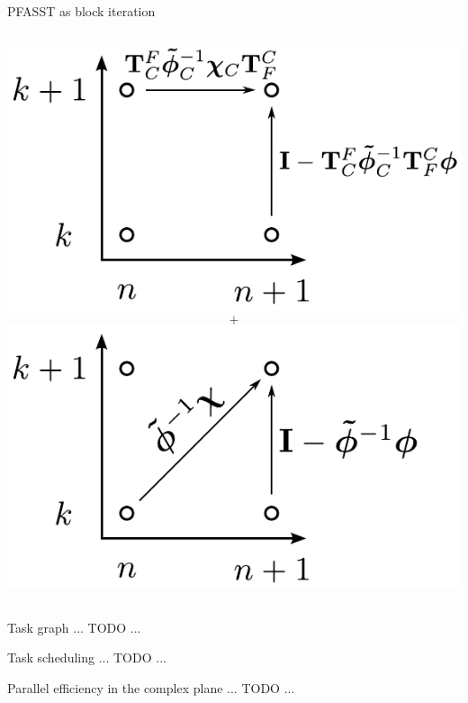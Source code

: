 \documentclass[11pt,aspectratio=43]{beamer}
\begin{document}
\begin{frame}{PFASST as block iteration}
\begin{columns}
		\centering
		\includegraphics[width=\linewidth]{kn-approxCGC.pdf}
		$$\textbf{+}$$
		\includegraphics[width=\linewidth]{kn-approxBlockJacobi.pdf}\vspace{-20pt}
	\end{columns}
\end{frame}

\begin{frame}{Task graph}
	... TODO ...
\end{frame}

\begin{frame}{Task scheduling}
	... TODO ...
\end{frame}

\begin{frame}{Parallel efficiency in the complex plane}
	... TODO ...
\end{frame}
\end{document}
